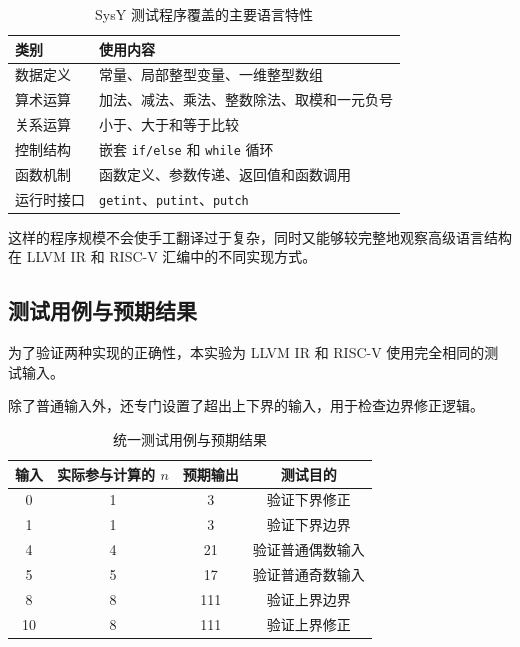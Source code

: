 \documentclass[12pt,a4paper]{ctexart}
\begin{document}
\begin{table}[H]
\centering
\caption{SysY 测试程序覆盖的主要语言特性}
\begin{tabularx}{\textwidth}{@{}p{3.0cm}X@{}}
\toprule
类别 & 使用内容 \\
\midrule

数据定义 &
常量、局部整型变量、一维整型数组 \\

算术运算 &
加法、减法、乘法、整数除法、取模和一元负号 \\

关系运算 &
小于、大于和等于比较 \\

控制结构 &
嵌套 \texttt{if/else} 和 \texttt{while} 循环 \\

函数机制 &
函数定义、参数传递、返回值和函数调用 \\

运行时接口 &
\texttt{getint}、\texttt{putint}、\texttt{putch} \\

\bottomrule
\end{tabularx}
\end{table}

这样的程序规模不会使手工翻译过于复杂，同时又能够较完整地观察高级语言结构在 LLVM IR 和 RISC-V 汇编中的不同实现方式。


\subsection{测试用例与预期结果}

为了验证两种实现的正确性，本实验为 LLVM IR 和 RISC-V 使用完全相同的测试输入。

除了普通输入外，还专门设置了超出上下界的输入，用于检查边界修正逻辑。

\begin{table}[H]
\centering
\caption{统一测试用例与预期结果}
\begin{tabular}{cccc}
\toprule
输入 & 实际参与计算的 $n$ & 预期输出 & 测试目的 \\
\midrule
0  & 1 & 3   & 验证下界修正 \\
1  & 1 & 3   & 验证下界边界 \\
4  & 4 & 21  & 验证普通偶数输入 \\
5  & 5 & 17  & 验证普通奇数输入 \\
8  & 8 & 111 & 验证上界边界 \\
10 & 8 & 111 & 验证上界修正 \\
\bottomrule
\end{tabular}
\end{table}
\end{document}
